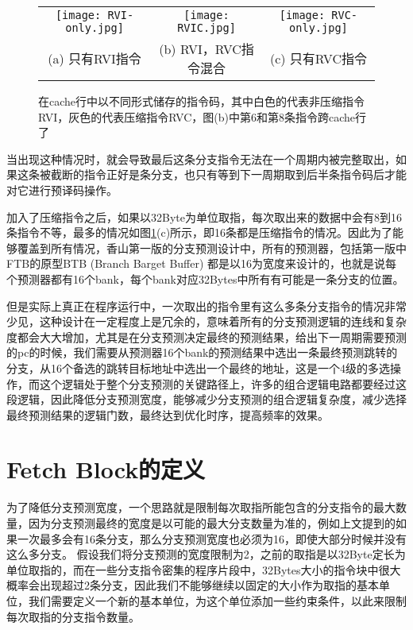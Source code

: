 \begin{figure}[htb]
    \centering
    \setlength\tabcolsep{3pt}  %
    \vspace{5pt} %
    \begin{tabular}{ccc}
        \texttt{[image: RVI-only.jpg]} &
        \texttt{[image: RVIC.jpg]} &
        \texttt{[image: RVC-only.jpg]} \\
        (a) 只有RVI指令 & (b) RVI，RVC指令混合 & (c) 只有RVC指令 \\[1ex]
    \end{tabular}
    \caption{在cache行中以不同形式储存的指令码，其中白色的代表非压缩指令RVI，灰色的代表压缩指令RVC，图(b)中第6和第8条指令跨cache行了}
    \label{fig:figure31}
\end{figure}

当出现这种情况时，就会导致最后这条分支指令无法在一个周期内被完整取出，如果这条被截断的指令正好是条分支，也只有等到下一周期取到后半条指令码后才能对它进行预译码操作。

加入了压缩指令之后，如果以32Byte为单位取指，每次取出来的数据中会有8到16条指令不等，最多的情况如图\ref{fig:figure31}(c)所示，即16条都是压缩指令的情况。因此为了能够覆盖到所有情况，香山第一版的分支预测设计中，所有的预测器，包括第一版中FTB的原型BTB (Branch Barget Buffer) 都是以16为宽度来设计的，也就是说每个预测器都有16个bank，每个bank对应32Bytes中所有有可能是一条分支的位置。

但是实际上真正在程序运行中，一次取出的指令里有这么多条分支指令的情况非常少见，这种设计在一定程度上是冗余的，意味着所有的分支预测逻辑的连线和复杂度都会大大增加，尤其是在分支预测决定最终的预测结果，给出下一周期需要预测的pc的时候，我们需要从预测器16个bank的预测结果中选出一条最终预测跳转的分支，从16个备选的跳转目标地址中选出一个最终的地址，这是一个4级的多选操作，而这个逻辑处于整个分支预测的关键路径上，许多的组合逻辑电路都要经过这段逻辑，因此降低分支预测宽度，能够减少分支预测的组合逻辑复杂度，减少选择最终预测结果的逻辑门数，最终达到优化时序，提高频率的效果。

\section{Fetch Block的定义}

为了降低分支预测宽度，一个思路就是限制每次取指所能包含的分支指令的最大数量，因为分支预测最终的宽度是以可能的最大分支数量为准的，例如上文提到的如果一次最多会有16条分支，那么分支预测宽度也必须为16，即使大部分时候并没有这么多分支。
假设我们将分支预测的宽度限制为2，之前的取指是以32Byte定长为单位取指的，而在一些分支指令密集的程序片段中，32Bytes大小的指令块中很大概率会出现超过2条分支，因此我们不能够继续以固定的大小作为取指的基本单位，我们需要定义一个新的基本单位，为这个单位添加一些约束条件，以此来限制每次取指的分支指令数量。

